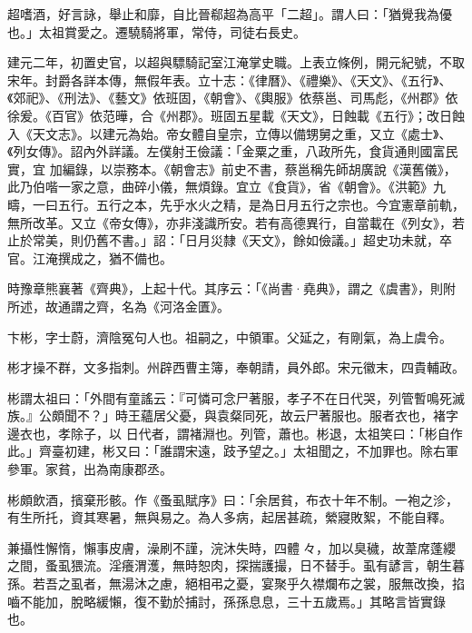 \begin{pinyinscope}
 超嗜酒，好言詠，舉止和靡，自比晉郗超為高平「二超」。謂人曰：「猶覺我為優也。」太祖賞愛之。遷驍騎將軍，常侍，司徒右長史。



 建元二年，初置史官，以超與驃騎記室江淹掌史職。上表立條例，開元紀號，不取宋年。封爵各詳本傳，無假年表。立十志：《律曆》、《禮樂》、《天文》、《五行》、《郊祀》、《刑法》、《藝文》依班固，《朝會》、《輿服》依蔡邕、司馬彪，《州郡》依徐爰。《百官》依范曄，合《州郡》。班固五星載《天文》，日蝕載《五行》；改日蝕入《天文志》。以建元為始。帝女體自皇宗，立傳以備甥舅之重，又立《處士》、《列女傳》。詔內外詳議。左僕射王儉議：「金粟之重，八政所先，食貨通則國富民實，宜
 加編錄，以崇務本。《朝會志》前史不書，蔡邕稱先師胡廣說《漢舊儀》，此乃伯喈一家之意，曲碎小儀，無煩錄。宜立《食貨》，省《朝會》。《洪範》九疇，一曰五行。五行之本，先乎水火之精，是為日月五行之宗也。今宜憲章前軌，無所改革。又立《帝女傳》，亦非淺識所安。若有高德異行，自當載在《列女》，若止於常美，則仍舊不書。」詔：「日月災隸《天文》，餘如儉議。」超史功未就，卒官。江淹撰成之，猶不備也。



 時豫章熊襄著《齊典》，上起十代。其序云：「《尚書·堯典》，謂之《虞書》，則附所述，故通謂之齊，名為《河洛金匱》。



 卞彬，字士蔚，濟陰冤句人也。祖嗣之，中領軍。父延之，有剛氣，為上虞令。



 彬才操不群，文多指刺。州辟西曹主簿，奉朝請，員外郎。宋元徽末，四貴輔政。



 彬謂太祖曰：「外間有童謠云：『可憐可念尸著服，孝子不在日代哭，列管暫鳴死滅族。』公頗聞不？」時王蘊居父憂，與袁粲同死，故云尸著服也。服者衣也，褚字邊衣也，孝除子，以
 日代者，謂褚淵也。列管，蕭也。彬退，太祖笑曰：「彬自作此。」齊臺初建，彬又曰：「誰謂宋遠，跂予望之。」太祖聞之，不加罪也。除右軍參軍。家貧，出為南康郡丞。



 彬頗飲酒，擯棄形骸。作《蚤虱賦序》曰：「余居貧，布衣十年不制。一袍之沴，有生所托，資其寒暑，無與易之。為人多病，起居甚疏，縈寢敗絮，不能自釋。



 兼攝性懈惰，懶事皮膚，澡刷不謹，浣沐失時，四體々，加以臭穢，故葦席蓬纓之間，蚤虱猥流。淫癢渭濩，無時恕肉，探揣護撮，日不替手。虱有諺言，朝生暮孫。若吾之虱者，無湯沐之慮，絕相弔之憂，宴聚乎久襟爛布之裳，服無改換，掐嚙不能加，脫略緩懶，復不勤於捕討，孫孫息息，三十五歲焉。」其略言皆實錄也。




\end{pinyinscope}
